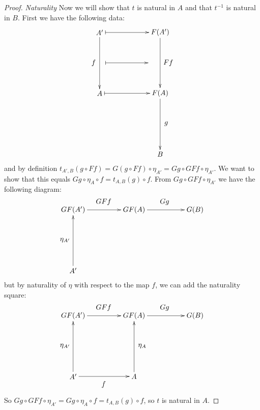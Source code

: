 \documentclass[11pt]{article}
\theoremstyle{definition}
\theoremstyle{definition}
\theoremstyle{plain}
\theoremstyle{plain}
\theoremstyle{plain}
\begin{document}
\begin{proof}
\emph{Naturality} Now we will show that $t$ is natural in $A$ and that $t^{-1}$ is natural in $B$. First we have the following data:
\begin{equation*}
\begin{xy}
(0,0)*+{A'}="ap"; (30, 0)*+{F(A')}="fap"; (0, -30)*+{A}="a"; (30, -30)*+{F(A)}="fa"; (30, -60)*+{B}="b";
{\ar "ap";"a"}?*!/^3mm/{f}; {\ar "fap";"fa"}?*!/_4mm/{Ff}; {\ar "fa";"b"}?*!/_3mm/{g};
{\ar@{|->} "ap";"fap"}; {\ar@{|->} (3,-15);(24, -15)}; {\ar@{|->} "a";"fa"};
\end{xy}
\end{equation*}
and by definition $t_{A',B}(g \circ Ff) = G(g \circ Ff) \circ \eta_{A'} = Gg \circ GFf \circ \eta_{A'}$. We want to show that this equals $Gg \circ \eta_{A} \circ f = t_{A,B}(g) \circ f$. From $Gg \circ GFf \circ \eta_{A'}$ we have the following diagram:
\begin{equation*}
\begin{xy}
(0,-30)*+{A'}="1";(0,0)*+{GF(A')}="2";(30,0)*+{GF(A)}="3";(60,0)*+{G(B)}="4";
{\ar "1";"2"}?*!/_4mm/{\eta_{A'}};
{\ar "2";"3"}?*!/_4mm/{GFf};
{\ar "3";"4"}?*!/_4mm/{Gg};
\end{xy}
\end{equation*}
but by naturality of $\eta$ with respect to the map $f$, we can add the naturality square:
\begin{equation*}
\begin{xy}
(0,-30)*+{A'}="1";(0,0)*+{GF(A')}="2";(30,0)*+{GF(A)}="3";(60,0)*+{G(B)}="4";(30,-30)*+{A}="5";
{\ar "1";"2"}?*!/_4mm/{\eta_{A'}};
{\ar "2";"3"}?*!/_4mm/{GFf};
{\ar "3";"4"}?*!/_4mm/{Gg};
{\ar "1";"5"}?*!/^4mm/{f};
{\ar "5";"3"}?*!/^4mm/{\eta_{A}};
\end{xy}
\end{equation*}

So $Gg \circ GFf \circ \eta_{A'} = Gg \circ \eta_{A} \circ f = t_{A,B}(g) \circ f$, so $t$ is natural in $A$.


\end{proof}
\end{document}
